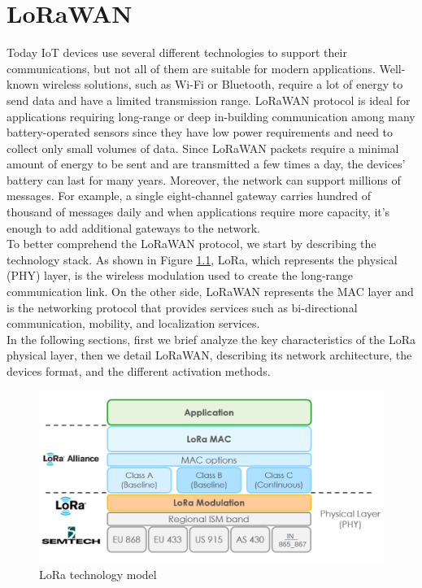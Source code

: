 \chapter{LoRaWAN}
\label{lorawan}
Today IoT devices use several different technologies to support their communications, but not all of them are suitable for modern applications. Well-known wireless solutions, such as Wi-Fi or Bluetooth, require a lot of energy to send data and have a limited transmission range. LoRaWAN protocol is ideal for applications requiring long-range or deep in-building communication among many battery-operated sensors since they have low power requirements and need to collect only small volumes of data. Since LoRaWAN packets require a minimal amount of energy to be sent and are transmitted a few times a day, the devices' battery can last for many years. Moreover, the network can support millions of messages. For example, a single eight-channel gateway carries hundred of thousand of messages daily and when applications require more capacity, it's enough to add additional gateways to the network.
\\
To better comprehend the LoRaWAN protocol, we start by describing the technology stack. As shown in Figure \ref{fig:stack}, LoRa, which represents the physical (PHY) layer, is the wireless modulation used to create the long-range communication link. On the other side, LoRaWAN represents the MAC layer and is the networking protocol that provides services such as bi-directional communication, mobility, and localization services.
\\
In the following sections, first we brief analyze the key characteristics of the LoRa physical layer, then we detail LoRaWAN, describing its network architecture, the devices format, and the different activation methods.
\begin{figure}
    \centering
    \includegraphics[width=0.7\linewidth]{images/lorawan/protocol_stack.png}
    \caption{LoRa technology model}
    \label{fig:stack}
\end{figure}

